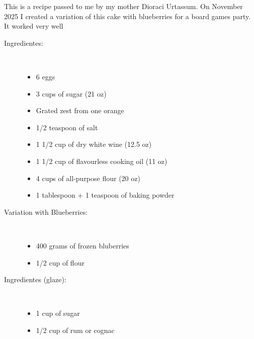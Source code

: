 \documentclass[11pt,letterpaper]{article}
\begin{document}


This is a recipe passed to me by my mother Dioraci Urtassum. On November 2025 I created a variation of this cake with blueberries for a board games party. It worked very well

\begin{description}

\item[Ingredientes:]\ \\
	\begin{itemize}
	\item 6 eggs
	\item 3 cups of sugar (21 oz)
	\item Grated zest from one orange
	\item 1/2 teaspoon of salt
	\item 1 1/2 cup of dry white wine (12.5 oz)
	\item 1 1/2 cup of flavourless cooking oil (11 oz)
	\item 4 cups of all-purpose flour (20 oz)
	\item 1 tablespoon + 1 teaspoon of baking powder
	\end{itemize}
	
\item[Variation with Blueberries:]\ \\
	\begin{itemize}
	\item 400 grams of frozen bluberries
	\item 1/2 cup of flour
	\end{itemize}

\item[Ingredientes (glaze):]\ \\
	\begin{itemize}
	\item 1 cup of sugar
	\item 1/2 cup of rum or cognac 
	\end{itemize}
	

\end{description}
\end{document}
